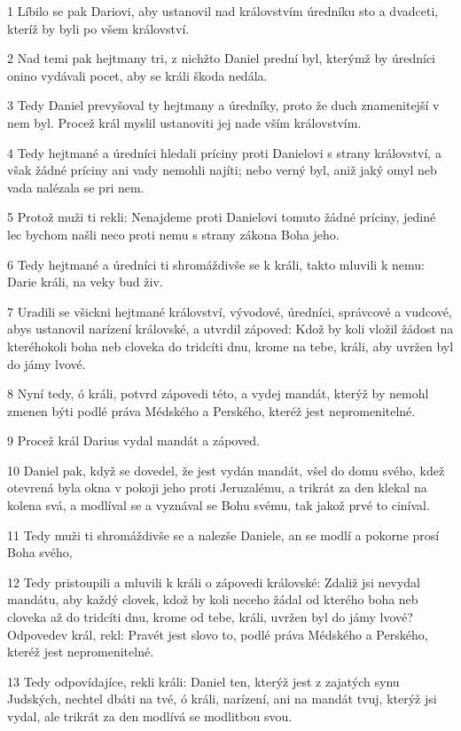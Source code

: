 \par 1 Líbilo se pak Dariovi, aby ustanovil nad královstvím úredníku sto a dvadceti, kteríž by byli po všem království.
\par 2 Nad temi pak hejtmany tri, z nichžto Daniel prední byl, kterýmž by úredníci onino vydávali pocet, aby se králi škoda nedála.
\par 3 Tedy Daniel prevyšoval ty hejtmany a úredníky, proto že duch znamenitejší v nem byl. Procež král myslil ustanoviti jej nade vším královstvím.
\par 4 Tedy hejtmané a úredníci hledali príciny proti Danielovi s strany království, a však žádné príciny ani vady nemohli najíti; nebo verný byl, aniž jaký omyl neb vada nalézala se pri nem.
\par 5 Protož muži ti rekli: Nenajdeme proti Danielovi tomuto žádné príciny, jediné lec bychom našli neco proti nemu s strany zákona Boha jeho.
\par 6 Tedy hejtmané a úredníci ti shromáždivše se k králi, takto mluvili k nemu: Darie králi, na veky bud živ.
\par 7 Uradili se všickni hejtmané království, vývodové, úredníci, správcové a vudcové, abys ustanovil narízení královské, a utvrdil zápoved: Kdož by koli vložil žádost na kteréhokoli boha neb cloveka do tridcíti dnu, krome na tebe, králi, aby uvržen byl do jámy lvové.
\par 8 Nyní tedy, ó králi, potvrd zápovedi této, a vydej mandát, kterýž by nemohl zmenen býti podlé práva Médského a Perského, kteréž jest nepromenitelné.
\par 9 Procež král Darius vydal mandát a zápoved.
\par 10 Daniel pak, když se dovedel, že jest vydán mandát, všel do domu svého, kdež otevrená byla okna v pokoji jeho proti Jeruzalému, a trikrát za den klekal na kolena svá, a modlíval se a vyznával se Bohu svému, tak jakož prvé to ciníval.
\par 11 Tedy muži ti shromáždivše se a nalezše Daniele, an se modlí a pokorne prosí Boha svého,
\par 12 Tedy pristoupili a mluvili k králi o zápovedi královské: Zdaliž jsi nevydal mandátu, aby každý clovek, kdož by koli neceho žádal od kterého boha neb cloveka až do tridcíti dnu, krome od tebe, králi, uvržen byl do jámy lvové? Odpovedev král, rekl: Pravét jest slovo to, podlé práva Médského a Perského, kteréž jest nepromenitelné.
\par 13 Tedy odpovídajíce, rekli králi: Daniel ten, kterýž jest z zajatých synu Judských, nechtel dbáti na tvé, ó králi, narízení, ani na mandát tvuj, kterýž jsi vydal, ale trikrát za den modlívá se modlitbou svou.
